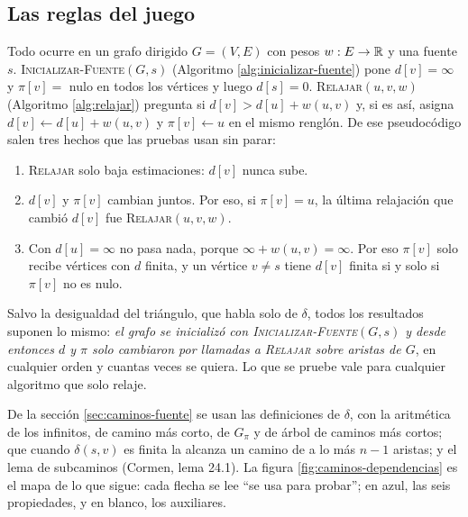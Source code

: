 \documentclass[11pt,letterpaper]{article}
\begin{document}

\subsection*{Las reglas del juego}

Todo ocurre en un grafo dirigido $G = (V, E)$ con pesos
$w : E \to \mathbb{R}$ y una fuente $s$. \textsc{Inicializar-Fuente}$(G, s)$
(Algoritmo \ref{alg:inicializar-fuente}) pone $d[v] = \infty$ y
$\pi[v] =$ nulo en todos los vértices y luego $d[s] = 0$.
\textsc{Relajar}$(u, v, w)$ (Algoritmo \ref{alg:relajar}) pregunta si
$d[v] > d[u] + w(u, v)$ y, si es así, asigna
$d[v] \gets d[u] + w(u, v)$ y $\pi[v] \gets u$ en el mismo renglón. De
ese pseudocódigo salen tres hechos que las pruebas usan sin parar:
\begin{enumerate}[label=(\roman*)]
  \item \textsc{Relajar} solo baja estimaciones: $d[v]$ nunca sube.
  \item $d[v]$ y $\pi[v]$ cambian juntos. Por eso, si $\pi[v] = u$, la
    última relajación que cambió $d[v]$ fue
    \textsc{Relajar}$(u, v, w)$.
  \item Con $d[u] = \infty$ no pasa nada, porque
    $\infty + w(u, v) = \infty$. Por eso $\pi[v]$ solo recibe vértices
    con $d$ finita, y un vértice $v \ne s$ tiene $d[v]$ finita si y
    solo si $\pi[v]$ no es nulo.
\end{enumerate}

Salvo la desigualdad del triángulo, que habla solo de $\delta$, todos
los resultados suponen lo mismo: \emph{el grafo se inicializó con
\textsc{Inicializar-Fuente}$(G, s)$ y desde entonces $d$ y $\pi$ solo
cambiaron por llamadas a \textsc{Relajar} sobre aristas de $G$}, en
cualquier orden y cuantas veces se quiera. Lo que se pruebe vale para
cualquier algoritmo que solo relaje.

De la sección \ref{sec:caminos-fuente} se usan las definiciones de
$\delta$, con la aritmética de los infinitos, de camino más corto, de
$G_\pi$ y de árbol de caminos más cortos; que cuando $\delta(s, v)$ es
finita la alcanza un camino de a lo más $n - 1$ aristas; y el lema de
subcaminos (Cormen, lema 24.1). La figura
\ref{fig:caminos-dependencias} es el mapa de lo que sigue: cada flecha
se lee ``se usa para probar''; en azul, las seis propiedades, y en
blanco, los auxiliares.
\end{document}
